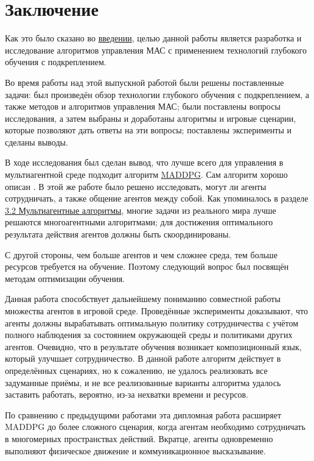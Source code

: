 \chapter*{Заключение} \label{ch-conclusion}

Как это было сказано во \hyperref[intro]{введении}, целью данной работы является разработка и исследование алгоритмов управления МАС с применением технологий глубокого обучения с подкреплением.

Во время работы над этой выпускной работой были решены поставленные задачи: был произведён обзор технологии глубокого обучения с подкреплением, а также методов и алгоритмов управления МАС; были поставлены вопросы исследования, а затем выбраны и доработаны алгоритмы и игровые сценарии, которые позволяют дать ответы на эти вопросы; поставлены эксперименты и сделаны выводы.

В ходе исследования был сделан вывод, что лучше всего для управления в мультиагентной среде подходит алгоритм \hyperref[acr:maddpg]{MADDPG}. Сам алгоритм хорошо описан \cite{lowe2017multiagent}. В этой же работе было решено исследовать, могут ли агенты сотрудничать, а также общение агентов между собой. Как упоминалось в разделе \hyperref[ch2:ma-algs]{3.2 Мультиагентные алгоритмы}, многие задачи из реального мира лучше решаются многоагентными алгоритмами; для достижения оптимального результата действия агентов должны быть скоординированы.

С другой стороны, чем больше агентов и чем сложнее среда, тем больше ресурсов требуется на обучение. Поэтому следующий вопрос был посвящён методам оптимизации обучения.

Данная работа способствует дальнейшему пониманию совместной работы множества агентов в игровой среде. Проведённые эксперименты доказывают, что агенты должны вырабатывать оптимальную политику сотрудничества с учётом полного наблюдения за состоянием окружающей среды и политиками других агентов. Очевидно, что в результате обучения возникает композиционный язык, который улучшает сотрудничество. В данной работе алгоритм действует в определённых сценариях, но к сожалению, не удалось реализовать все задуманные приёмы, и не все реализованные варианты алгоритма удалось заставить работать, вероятно, из-за нехватки времени и ресурсов.

По сравнению с предыдущими работами эта дипломная работа расширяет MADDPG до более сложного сценария, когда агентам необходимо сотрудничать в многомерных пространствах действий. Вкратце, агенты одновременно выполняют физическое движение и коммуникационное высказывание.

